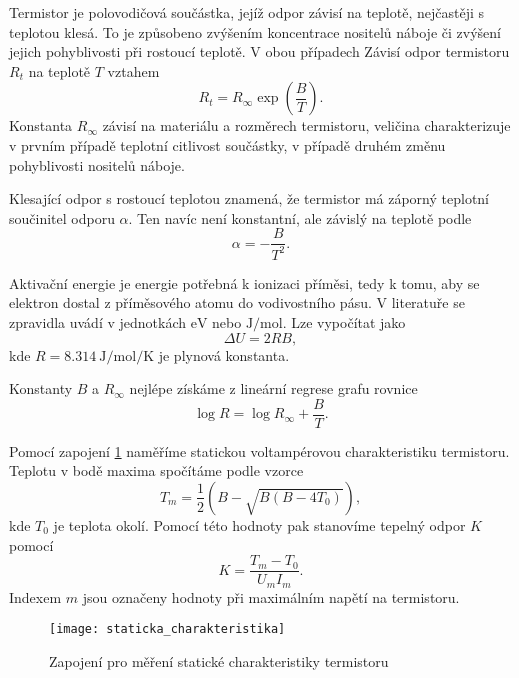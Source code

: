 \documentclass[0-protokol.tex]{subfiles}
\begin{document}
Termistor je polovodičová součástka, jejíž odpor závisí na teplotě, nejčastěji s teplotou klesá. To je způsobeno zvýšením koncentrace nositelů náboje či zvýšení jejich pohyblivosti při rostoucí teplotě. V obou případech Závisí odpor termistoru $R_t$ na teplotě $T$ vztahem 
\begin{equation} \label{eq:odpor_teplota}
R_t = R_\infty \exp(\frac{B}{T}).
\end{equation}
Konstanta $R_\infty$ závisí na materiálu a rozměrech termistoru, veličina charakterizuje v prvním případě teplotní citlivost součástky, v případě druhém změnu pohyblivosti nositelů náboje.

Klesající odpor s rostoucí teplotou znamená, že termistor má záporný teplotní součinitel odporu $\alpha$. Ten navíc není konstantní, ale závislý na teplotě podle
\begin{equation} \label{eq:alpha}
\alpha = -\frac{B}{T^2}.
\end{equation}

Aktivační energie je energie potřebná k ionizaci příměsi, tedy k tomu, aby se elektron dostal z příměsového atomu do vodivostního pásu. V literatuře se zpravidla uvádí v jednotkách $\si{\electronvolt}$ nebo $\si{\joule\per\mole}$. Lze vypočítat jako 
\begin{equation} \label{eq:delta_U}
\Delta U = 2RB,
\end{equation}
kde $R = \SI{8.314}{\joule\per\mole\per\kelvin}$ je plynová konstanta.

Konstanty $B$ a $R_\infty$ nejlépe získáme z lineární regrese grafu rovnice 
\begin{equation} \label{eq:log_R}
\log R = \log R_\infty + \frac{B}{T}.
\end{equation}

Pomocí zapojení \ref{fig:staticka_charakteristika} naměříme statickou voltampérovou charakteristiku termistoru. Teplotu v bodě maxima spočítáme podle vzorce 
\begin{equation} \label{eq:teplota_v_max}
T_m = \frac{1}{2} (B - \sqrt{B(B-4T_0)}),
\end{equation}
kde $T_0$ je teplota okolí. Pomocí této hodnoty pak stanovíme tepelný odpor $K$ pomocí 
\begin{equation} \label{eq:K}   
K = \frac{T_m-T_0}{U_m I_m}.
\end{equation}  
Indexem $m$ jsou označeny hodnoty při maximálním napětí na termistoru.

\begin{figure}[H]
\centering
\texttt{[image: staticka\_charakteristika]}
\caption{Zapojení pro měření statické charakteristiky termistoru}
\label{fig:staticka_charakteristika}
\end{figure}
\end{document}
